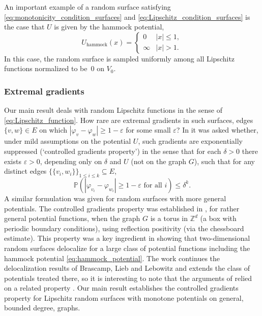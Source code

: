 \documentclass[english]{article}
\theoremstyle{plain}
\theoremstyle{plain}
\begin{document}
An important example of a random surface satisfying
\eqref{eq:monotonicity_condition_surfaces} and
\eqref{eq:Lipschitz_condition_surfaces} is the case that $U$ is
given by the hammock potential,
\begin{equation}\label{eq:hammock_potential}
  U_{\text{hammock}}(x) = \begin{cases}
    0&|x|\le 1,\\
    \infty&|x|>1.
  \end{cases}
\end{equation}
In this case, the random surface is sampled uniformly among all
Lipschitz functions normalized to be~$0$ on $V_0$.

\subsubsection{Extremal gradients}
Our main result deals with random Lipschitz functions in the sense
of \eqref{eq:Lipschitz_function}. How rare are extremal gradients in
such surfaces, edges $\{v,w\}\in E$ on which $|\varphi_v -
\varphi_w|\ge 1-\varepsilon$ for some small $\varepsilon$? In
\cite[Section~6]{milos2015delocalization} it was asked whether,
under mild assumptions on the potential $U$, such gradients are
exponentially suppressed (`controlled gradients property') in the
sense that for each $\delta>0$ there exists $\varepsilon>0$,
depending only on $\delta$ and $U$ (not on the graph $G$), such
that for any distinct edges $\{\{v_i, w_i\}\}_{1\le i\le k}
\subseteq E$,
\begin{equation*}
  \mathbb{P}(|\varphi_{v_i} - \varphi_{w_i}|\ge 1-\varepsilon\text{ for all
  $i$})\le \delta^k.
\end{equation*}
A similar formulation was given for random surfaces with more
general potentials. The controlled gradients property was
established in \cite{milos2015delocalization}, for rather general
potential functions, when the graph $G$ is a torus in $\mathbb{Z}^d$
(a box with periodic boundary conditions), using reflection
positivity (via the chessboard estimate). This property was a key
ingredient in showing that two-dimensional random surfaces
delocalize for a large class of potential functions including the
hammock potential \eqref{eq:hammock_potential}. The work
\cite{milos2015delocalization} continues the delocalization results
of Brascamp, Lieb and Lebowitz \cite[Section
V]{brascamp1975statistical} and extends the class of potentials
treated there, so it is interesting to note that the arguments of
\cite{brascamp1975statistical} relied on a related property
\cite[inequality (16)]{brascamp1975statistical}. Our main result
establishes the controlled gradients property for Lipschitz random
surfaces with monotone potentials on general, bounded degree,
graphs.
\end{document}
